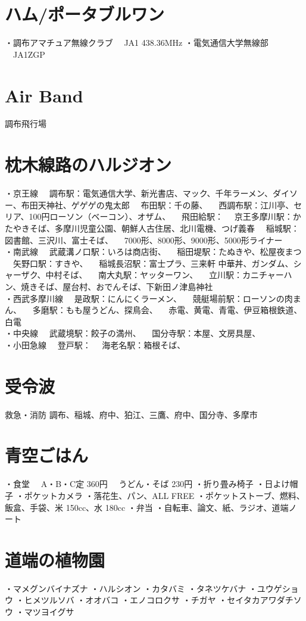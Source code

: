 \documentclass[12pt,a4paper]{jbook}
\begin{document}
\section{ハム/ポータブルワン}
・調布アマチュア無線クラブ
　JA1   438.36MHz
・電気通信大学無線部
　JA1ZGP
\section{Air Band}
調布飛行場
\section{枕木線路のハルジオン}
・京王線
　調布駅：電気通信大学、新光書店、マック、千年ラーメン、ダイソー、布田天神社、ゲゲゲの鬼太郎
　布田駅：千の藤、
　西調布駅：江川亭、セリア、100円ローソン（ベーコン）、オザム、
　飛田給駅：
　京王多摩川駅：かたやきそば、多摩川児童公園、朝鮮人古住居、北川電機、つげ義春
　稲城駅：図書館、三沢川、富士そば、
　7000形、8000形、9000形、5000形ライナー
\\
・南武線
　武蔵溝ノ口駅：いろは商店街、
　稲田堤駅：たぬきや、松屋夜まつ
　矢野口駅：すきや、
　稲城長沼駅：富士プラ、三来軒 中華丼、ガンダム、シャーザク、中村そば、
　南大丸駅：ヤッターワン、
　立川駅：カニチャーハン、焼きそば、屋台村、おでんそば、下新田ノ津島神社
\\
・西武多摩川線
　是政駅：にんにくラーメン、
　競艇場前駅：ローソンの肉まん、
　多磨駅：もも屋うどん、探鳥会、
　赤電、黄電、青電、伊豆箱根鉄道、白電
\\
・中央線
　武蔵境駅：餃子の満州、
　国分寺駅：本屋、文房具屋、
\\
・小田急線
　登戸駅：
　海老名駅：箱根そば、
\section{受令波}
救急・消防
調布、稲城、府中、狛江、三鷹、府中、国分寺、多摩市
\section{青空ごはん}
・食堂
　A・B・C定 360円
　うどん・そば 230円
・折り畳み椅子
・日よけ帽子
・ポケットカメラ
・落花生、パン、ALL FREE
・ポケットストーブ、燃料、飯盒、手袋、米 150cc、水 180cc
・弁当
・自転車、論文、紙、ラジオ、道端ノート
\section{道端の植物園}
・マメグンバイナズナ
・ハルシオン
・カタバミ
・タネツケバナ
・ユウゲショウ
・ヒメツルソバ
・オオバコ
・エノコロクサ
・チガヤ
・セイタカアワダチソウ
・マツヨイグサ
\end{document}
